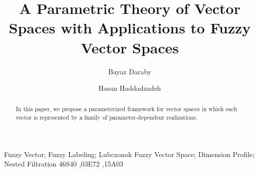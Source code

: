 \documentclass[preprint,12pt]{elsarticle}
\theoremstyle{definition}
\begin{document}
	
	\begin{frontmatter}
		
	\title{A Parametric Theory of Vector Spaces with Applications to Fuzzy Vector Spaces}
		
		\author[1]{Bayaz Daraby}
		
	
		\author[1]{Hasan Haddadzadeh}
		
		
		\address[1]{Department of Mathematics, University of Maragheh,
			P.O. Box 55136--553, Maragheh, Iran}
	\begin{abstract}
In this paper, we propose a parameterized framework for vector spaces in which each vector is represented by a family of parameter-dependent realizations.
	
	\end{abstract}
	
		
		
		\begin{keyword}
		
		Fuzzy Vector;
		Fuzzy Labeling;
		Lubczonok Fuzzy Vector Space;
		Dimension Profile;
		Nested Filtration
			\MSC[2020] 46S40 \sep 03E72 \sep 15A03
		\end{keyword}
		
	\end{frontmatter}
	
	\allowdisplaybreaks
\end{document}
